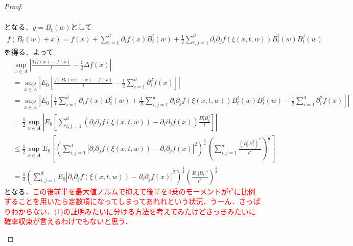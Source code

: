 \documentclass[dvipdfmx]{jsarticle}
\newtheorem{proof}{証明}
\begin{document}
\begin{proof}
\begin{enumerate}
\begin{align*}
\end{align*}
となる．$y=B_t(w)$として
\begin{align*}
f(B_t(w)+x)=f(x)+\sum_{i=1}^d \partial_if(x)B_t^i(w)+\frac{1}{2}\sum_{i,j=1}^d\partial_i\partial_j f(\xi(x,t,w))B_t^i(w)B_t^j(w)
\end{align*}
を得る．よって
\begin{align*}
&\sup_{x\in A}\left|\frac{T_t f(x)-f(x)}{t}-\frac{1}{2}\Delta f(x)\right| \\
&=\sup_{x\in A}\left|E_0\left[\frac{f(B_t(w)+x)-f(x)}{t}-\frac{1}{2}\sum_{i=1}^d\partial_i^2 f(x)\right]\right| \\
&=\sup_{x\in A}\left|E_0\left[\frac{1}{t}\sum_{i=1}^d \partial_if(x)B_t^i(w)+\frac{1}{2t}\sum_{i,j=1}^d\partial_i\partial_j f(\xi(x,t,w))B_t^i(w)B_t^j(w)-\frac{1}{2}\sum_{i=1}^d\partial_i^2 f(x)\right]\right| \\
&=\frac{1}{2}\sup_{x\in A}\left|E_0\left[\sum_{i,j=1}^d\left(\partial_i\partial_j f(\xi(x,t,w))-\partial_i\partial_jf(x)\right)\frac{B_t^iB_t^j}{t}\right]\right| \\
&\leq\frac{1}{2}\sup_{x\in A}E_0\left[\left(\sum_{i,j=1}^d\left|\partial_i\partial_j f(\xi(x,t,w))-\partial_i\partial_jf(x)\right|^2\right)^{\frac{1}{2}}\left(\sum_{i,j=1}^d\frac{(B_t^iB_t^j)^2}{t^2}\right)^{\frac{1}{2}}\right] \\
&=\frac{1}{2}\left(\sum_{i,j=1}^d E_0\left|\partial_i\partial_j f(\xi(x,t,w))-\partial_i\partial_jf(x)\right|^2\right)^{\frac{1}{2}}\left(\frac{E_0|B_t|^4}{t^2}\right)^{\frac{1}{2}}
\end{align*}
となる．\textcolor{red}{この後前半を最大値ノルムで抑えて後半を4乗のモーメントが$t^2$に比例することを用いたら定数項になってしまってあれれという状況．うーん．さっぱりわからない．(1)の証明みたいに分ける方法を考えてみたけどさっきみたいに確率収束が言えるわけでもないと思う．}



\end{enumerate}
\end{proof}
\end{document}
